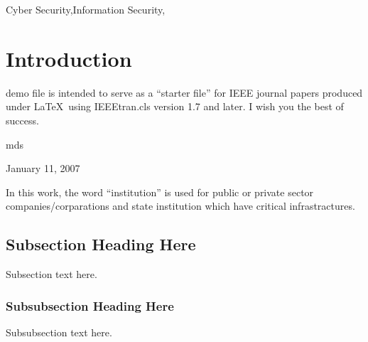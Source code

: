 \documentclass[journal]{IEEEtran}
\begin{document}
\begin{IEEEkeywords}
Cyber Security,Information Security,
\end{IEEEkeywords}

\IEEEpeerreviewmaketitle



\section{Introduction}


%
%
%
%
 demo file is intended to serve as a ``starter file''
for IEEE journal papers produced under \LaTeX\ using
IEEEtran.cls version 1.7 and later.
I wish you the best of success.

\hfill mds

\hfill January 11, 2007


In this work, the word “institution” is used for public or private sector companies/corparations and state institution which have critical infrastractures.

\subsection{Subsection Heading Here}
Subsection text here.


\subsubsection{Subsubsection Heading Here}
Subsubsection text here.
\end{document}

